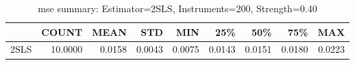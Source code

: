 \begin{table}[ht]
\centering
\caption{mse summary: Estimator=2SLS, Instruments=200, Strength=0.40}
\begin{tabular}{lrrrrrrrr}
\toprule
 & COUNT & MEAN & STD & MIN & 25\% & 50\% & 75\% & MAX \\
\midrule
2SLS & 10.0000 & 0.0158 & 0.0043 & 0.0075 & 0.0143 & 0.0151 & 0.0180 & 0.0223 \\
\bottomrule
\end{tabular}
\end{table}
